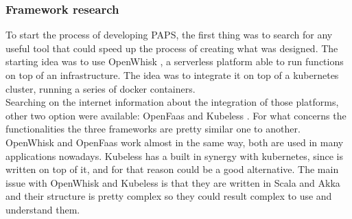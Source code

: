 \subsubsection*{Framework research}
To start the process of developing PAPS, the first thing was to search for any useful tool 
that could speed up the process of creating what was designed.  
The starting idea was to use OpenWhisk \cite{OpenWhisk}, a serverless platform able to run 
functions on top of an infrastructure. The idea was to integrate it on top of a kubernetes 
cluster, running a series of docker \cite{Docker} containers. \\
Searching on the internet information about the integration of those platforms, other two 
option were available: OpenFaas \cite{Faas} and Kubeless \cite{Kubeless}. For what concerns 
the functionalities the three frameworks are pretty similar one to another. OpenWhisk and 
OpenFaas work almost in the same way, both are used in many applications nowadays. 
Kubeless has a built in synergy with kubernetes, since is written on top of it,  and for 
that reason could be a good alternative. The main issue with OpenWhisk and Kubeless is 
that they are written in Scala and Akka and their structure is pretty complex so they could
result complex to use and understand them.
